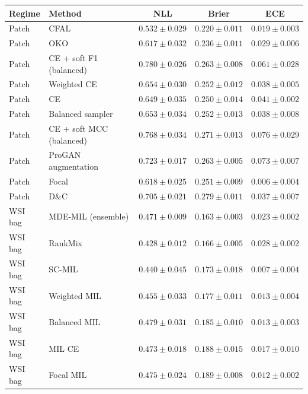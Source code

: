 \begin{tabular}{llccc}
\toprule
Regime & Method & NLL & Brier & ECE\\
\midrule
Patch & CFAL & $\num{0.532} \pm \num{0.029}$ & $\num{0.220} \pm \num{0.011}$ & $\num{0.019} \pm \num{0.003}$\\
Patch & OKO & $\num{0.617} \pm \num{0.032}$ & $\num{0.236} \pm \num{0.011}$ & $\num{0.029} \pm \num{0.006}$\\
Patch & CE + soft F1 (balanced) & $\num{0.780} \pm \num{0.026}$ & $\num{0.263} \pm \num{0.008}$ & $\num{0.061} \pm \num{0.028}$\\
Patch & Weighted CE & $\num{0.654} \pm \num{0.030}$ & $\num{0.252} \pm \num{0.012}$ & $\num{0.038} \pm \num{0.005}$\\
Patch & CE & $\num{0.649} \pm \num{0.035}$ & $\num{0.250} \pm \num{0.014}$ & $\num{0.041} \pm \num{0.002}$\\
Patch & Balanced sampler & $\num{0.653} \pm \num{0.034}$ & $\num{0.252} \pm \num{0.013}$ & $\num{0.038} \pm \num{0.008}$\\
Patch & CE + soft MCC (balanced) & $\num{0.768} \pm \num{0.034}$ & $\num{0.271} \pm \num{0.013}$ & $\num{0.076} \pm \num{0.029}$\\
Patch & ProGAN augmentation & $\num{0.723} \pm \num{0.017}$ & $\num{0.263} \pm \num{0.005}$ & $\num{0.073} \pm \num{0.007}$\\
Patch & Focal & $\num{0.618} \pm \num{0.025}$ & $\num{0.251} \pm \num{0.009}$ & $\num{0.006} \pm \num{0.004}$\\
Patch & D\&C & $\num{0.705} \pm \num{0.021}$ & $\num{0.279} \pm \num{0.011}$ & $\num{0.037} \pm \num{0.007}$\\
\addlinespace
WSI bag & MDE-MIL (ensemble) & $\num{0.471} \pm \num{0.009}$ & $\num{0.163} \pm \num{0.003}$ & $\num{0.023} \pm \num{0.002}$\\
WSI bag & RankMix & $\num{0.428} \pm \num{0.012}$ & $\num{0.166} \pm \num{0.005}$ & $\num{0.028} \pm \num{0.002}$\\
WSI bag & SC-MIL & $\num{0.440} \pm \num{0.045}$ & $\num{0.173} \pm \num{0.018}$ & $\num{0.007} \pm \num{0.004}$\\
WSI bag & Weighted MIL & $\num{0.455} \pm \num{0.033}$ & $\num{0.177} \pm \num{0.011}$ & $\num{0.013} \pm \num{0.004}$\\
WSI bag & Balanced MIL & $\num{0.479} \pm \num{0.031}$ & $\num{0.185} \pm \num{0.010}$ & $\num{0.013} \pm \num{0.003}$\\
WSI bag & MIL CE & $\num{0.473} \pm \num{0.018}$ & $\num{0.188} \pm \num{0.015}$ & $\num{0.017} \pm \num{0.010}$\\
WSI bag & Focal MIL & $\num{0.475} \pm \num{0.024}$ & $\num{0.189} \pm \num{0.008}$ & $\num{0.012} \pm \num{0.002}$\\
\bottomrule
\end{tabular}
